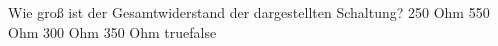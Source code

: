    {Wie groß ist der Gesamtwiderstand der dargestellten Schaltung?}
    {250 Ohm}
    {550 Ohm}
    {300 Ohm}
    {350 Ohm}
    {true}{false}